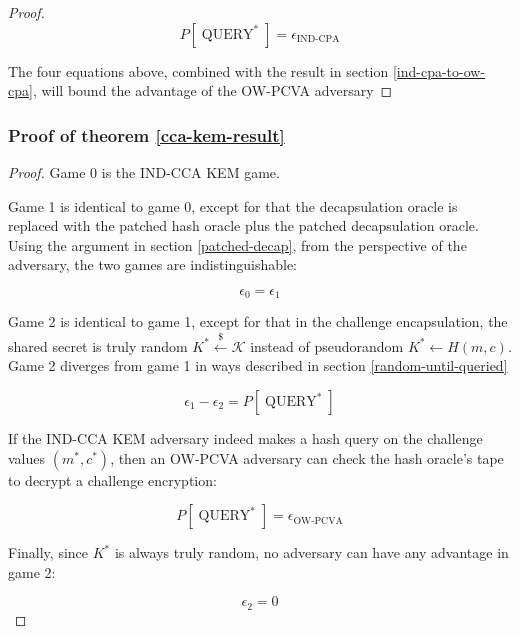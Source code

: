 \documentclass{article}
\newcommand{\leftsample}{\overset{{\scriptscriptstyle\$}}{\leftarrow}}
\begin{document}
\begin{proof}
    \begin{equation*}
        P[\operatorname{QUERY}^\ast] = \epsilon_\text{IND-CPA}
    \end{equation*}

    The four equations above, combined with the result in section \ref{ind-cpa-to-ow-cpa}, will bound the advantage of the OW-PCVA adversary
\end{proof}

\subsubsection{Proof of theorem \ref{cca-kem-result}}
\begin{proof}
    Game 0 is the IND-CCA KEM game.

    Game 1 is identical to game 0, except for that the decapsulation oracle is replaced with the patched hash oracle plus the patched decapsulation oracle. Using the argument in section \ref{patched-decap}, from the perspective of the adversary, the two games are indistinguishable:

    \begin{equation*}
        \epsilon_0 = \epsilon_1
    \end{equation*}

    Game 2 is identical to game 1, except for that in the challenge encapsulation, the shared secret is truly random $K^\ast \leftsample \mathcal{K}$ instead of pseudorandom $K^\ast \leftarrow H(m, c)$. Game 2 diverges from game 1 in ways described in section \ref{random-until-queried}

    \begin{equation*}
        \epsilon_1 - \epsilon_2 = P[\operatorname{QUERY}^\ast]
    \end{equation*}

    If the IND-CCA KEM adversary indeed makes a hash query on the challenge values $(m^\ast, c^\ast)$, then an OW-PCVA adversary can check the hash oracle's tape to decrypt a challenge encryption:

    \begin{equation*}
        P[\operatorname{QUERY}^\ast] = \epsilon_\text{OW-PCVA}
    \end{equation*}

    Finally, since $K^\ast$ is always truly random, no adversary can have any advantage in game 2:

    \begin{equation*}
        \epsilon_2 = 0
    \end{equation*}
\end{proof}
\end{document}
